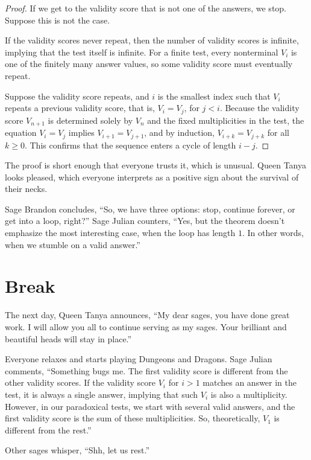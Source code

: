 \documentclass[12pt,reqno]{article}
\theoremstyle{plain}
\theoremstyle{definition}
\theoremstyle{remark}
\begin{document}
\begin{proof}
    If we get to the validity score that is not one of the answers, we stop. Suppose this is not the case.
    
    If the validity scores never repeat, then the number of validity scores is infinite, implying that the test itself is infinite. For a finite test, every nonterminal $V_i$ is one of the finitely many answer values, so some validity score must eventually repeat.
    
    Suppose the validity score repeats, and $i$ is the smallest index such that $V_i$ repeats a previous validity score, that is, $V_i = V_j$, for $j < i$. Because the validity score $V_{n+1}$ is determined solely by $V_n$ and the fixed multiplicities in the test, the equation $V_i = V_j$ implies $V_{i+1} = V_{j+1}$, and by induction, $V_{i+k} = V_{j+k}$ for all $k \ge 0$. This confirms that the sequence enters a cycle of length $i - j$.
\end{proof}

The proof is short enough that everyone trusts it, which is unusual. Queen Tanya looks pleased, which everyone interprets as a positive sign about the survival of their necks.

Sage Brandon concludes, ``So, we have three options: stop, continue forever, or get into a loop, right?'' Sage Julian counters, ``Yes, but the theorem doesn't emphasize the most interesting case, when the loop has length $1$. In other words, when we stumble on a valid answer.''

\section*{Break}

The next day, Queen Tanya announces, ``My dear sages, you have done great work. I will allow you all to continue serving as my sages. Your brilliant and beautiful heads will stay in place.''

Everyone relaxes and starts playing Dungeons and Dragons. Sage Julian comments, ``Something bugs me. The first validity score is different from the other validity scores. If the validity score $V_i$ for $i > 1$ matches an answer in the test, it is always a single answer, implying that such $V_i$ is also a multiplicity. However, in our paradoxical tests, we start with several valid answers, and the first validity score is the sum of these multiplicities. So, theoretically, $V_1$ is different from the rest.''

Other sages whisper, ``Shh, let us rest.''
\end{document}
